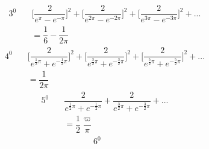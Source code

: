 \[
\begin{aligned}3^{0}\quad&
\biggl[\dfrac{2}{e^\pi-e^{-\pi}}\biggr]^2
+\biggl[\dfrac{2}{e^{2\pi}-e^{-2\pi}}\biggr]^2
+\biggl[\dfrac{2}{e^{3\pi}-e^{-3\pi}}\biggr]^2+\mathord{.}\mathord{.}\mathord{.}
\\[8pt]&=\dfrac16-\dfrac{1}{2\pi}\end{aligned}
\]
\[
\begin{aligned}4^{0}\quad&
\biggl[\dfrac{2}{e^{\frac12\pi}+e^{-\frac12\pi}}\biggr]^2
+\biggl[\dfrac{2}{e^{\frac32\pi}+e^{-\frac32\pi}}\biggr]^2
+\biggl[\dfrac{2}{e^{\frac52\pi}+e^{-\frac52\pi}}\biggr]^2+\mathord{.}\mathord{.}\mathord{.}
\\[8pt]&=\dfrac{1}{2\pi}\end{aligned}
\]
\[
\begin{aligned}5^{0}\quad&
\dfrac{2}{e^{\frac12\pi}+e^{-\frac12\pi}}
+\dfrac{2}{e^{\frac32\pi}+e^{-\frac32\pi}}+\mathord{.}\mathord{.}\mathord{.}
\\[8pt]&=\dfrac12\dfrac\varpi\pi\end{aligned}
\]
\nopagebreak[4]
\[
\begin{aligned}6^{0}\quad&\end{aligned}
\]



